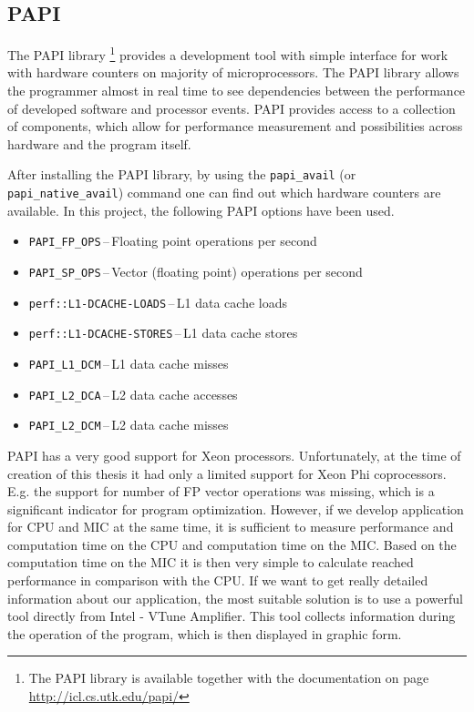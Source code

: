\subsection{PAPI}
The PAPI library \footnote{The PAPI library is available together with the documentation on page \url{http://icl.cs.utk.edu/papi/}} provides a development tool with simple interface for work with hardware counters on majority of microprocessors. The PAPI library allows the programmer almost in real time to see dependencies between the performance of developed software and processor events. PAPI provides access to a collection of components, which allow for performance measurement and possibilities across hardware and the program itself.

\par After installing the PAPI library, by using the \texttt{papi\_avail} (or \texttt{papi\_native\_avail}) command one can find out which hardware counters are available. In this project, the following PAPI options have been used.

\begin{itemize}
\item{\texttt{PAPI\_FP\_OPS}\,--\,Floating point operations per second}
\item{\texttt{PAPI\_SP\_OPS}\,--\,Vector (floating point) operations per second}
\item{\texttt{perf::L1-DCACHE-LOADS}\,--\,L1 data cache loads}
\item{\texttt{perf::L1-DCACHE-STORES}\,--\,L1 data cache stores}
\item{\texttt{PAPI\_L1\_DCM}\,--\,L1 data cache misses}
\item{\texttt{PAPI\_L2\_DCA}\,--\,L2 data cache accesses}
\item{\texttt{PAPI\_L2\_DCM}\,--\,L2 data cache misses}

\end{itemize}

PAPI has a very good support for Xeon processors. Unfortunately, at the time of creation of this thesis it had only a limited support for Xeon Phi coprocessors. E.g. the support for number of FP vector operations was missing, which is a significant indicator for program optimization.  
However, if we develop application for CPU and MIC at the same time, it is sufficient to measure performance and computation time on the CPU and computation time on the MIC. Based on the computation time on the MIC it is then very simple to calculate reached performance in comparison with the CPU.
If we want to get really detailed information about our application, the most suitable solution is to use a powerful tool directly from Intel - VTune Amplifier. This tool collects information during the operation of the program, which is then displayed in graphic form.

